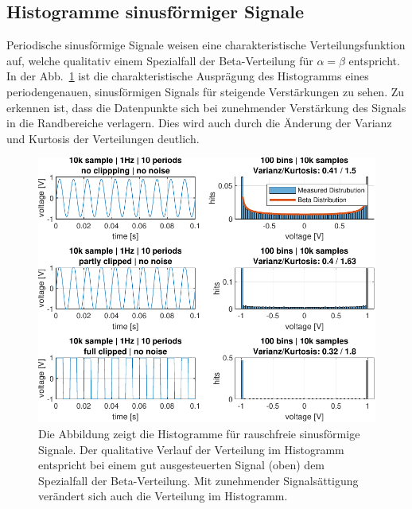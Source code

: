 \subsection{Histogramme sinusförmiger Signale }
Periodische sinusförmige Signale weisen eine charakteristische Verteilungsfunktion auf, welche qualitativ einem Spezialfall der Beta-Verteilung für $\alpha = \beta$ entspricht. In der Abb.~\ref{fig:Histogramm-Gain} ist die charakteristische Ausprägung des Histogramms eines periodengenauen, sinusförmigen Signals für steigende Verstärkungen zu sehen. Zu erkennen ist, dass die Datenpunkte sich bei zunehmender Verstärkung des Signals in die Randbereiche verlagern. Dies wird auch durch die Änderung der Varianz und Kurtosis der Verteilungen deutlich.
\begin{figure}[h!] 
	\centering 
	\includegraphics[width=1\columnwidth]{../img/beta-distribution.pdf}
	\caption{Die Abbildung zeigt die Histogramme für rauschfreie sinusförmige Signale. Der qualitative Verlauf der Verteilung im Histogramm entspricht bei einem gut ausgesteuerten Signal (oben) dem Spezialfall der Beta-Verteilung. Mit zunehmender Signalsättigung verändert sich auch die Verteilung im Histogramm.}
	\label{fig:Histogramm-Gain}
\end{figure} 
